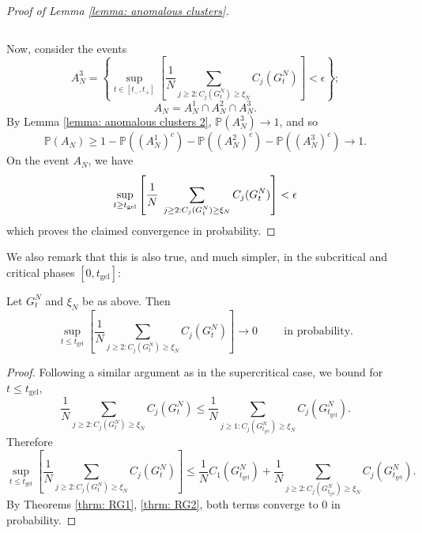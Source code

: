 \begin{proof}[Proof of Lemma \ref{lemma: anomalous clusters}]
\begin{enumerate}[label=\roman{*}).]
\begin{equation}
    \end{equation}
\end{enumerate}
Now, consider the events
\begin{equation}
    A^3_N=\left\{\sup_{t\in [t_-, t_+]}\left[\frac{1}{N}\sum_{j\geq 2: C_j(G^N_{t})\geq \xi_N} C_j(G^N_{t})\right]<\epsilon \right\};\end{equation}
    \begin{equation}
    A_N=A^1_N\cap A^2_N\cap A^3_N.\end{equation} By Lemma \ref{lemma: anomalous clusters 2}, $\mathbb{P}(A^3_N)\rightarrow 1$, and so \begin{equation}
        \mathbb{P}(A_N)\geq 1-\mathbb{P}((A^1_N)^c)-\mathbb{P}((A^2_N)^c)-\mathbb{P}((A^3_N)^c) \rightarrow 1.
    \end{equation} On the event $A_N$, we have \begin{equation}
        \sup_{t\geq t_\text{gel}}\left[\frac{1}{N}\hspace{0.1cm} \sum_{j\geq 2: C_j(G^N_t)\geq \xi_N} C_j(G^N_t)\right] <\epsilon
    \end{equation} which proves the claimed convergence in probability. 
\end{proof} 
We also remark that this is also true, and much simpler, in the subcritical and critical phases $[0, t_\text{gel}]:$ 
\begin{lemma}\label{lemma: large clusters below criticality} Let $G^N_t$ and $\xi_N$ be as above. Then \begin{equation}
    \sup_{t\le t_\text{gel}} \left[\frac{1}{N}\sum_{j\geq 2: C_j(G^N_t)\ge \xi_N} C_j(G^N_t)\right]\rightarrow 0\hspace{1cm}\text{in probability}.
\end{equation} \end{lemma}\begin{proof} Following a similar argument as in the supercritical case, we bound for $t\leq t_\text{gel}$, \begin{equation}
    \frac{1}{N}\sum_{j\geq 2: C_j(G^N_t)\geq \xi_N} C_j(G^N_t) \leq \frac{1}{N}\sum_{j\geq 1: C_j(G^N_{t_\text{gel}})\geq \xi_N} C_j(G^N_{t_\text{gel}}).
\end{equation} Therefore \begin{equation}
    \sup_{t\le t_\text{gel}} \left[\frac{1}{N}\sum_{j\geq 2: C_j(G^N_t)\geq \xi_N} C_j(G^N_t)\right] \leq  \frac{1}{N}C_1(G^N_{t_\text{gel}})+ \frac{1}{N}\sum_{j\geq 2: C_j(G^N_{t_\text{gel}})\geq \xi_N} C_j(G^N_{t_\text{gel}}).
\end{equation} By Theorems \ref{thrm: RG1}, \ref{thrm: RG2}, both terms converge to $0$ in probability. \end{proof}  
